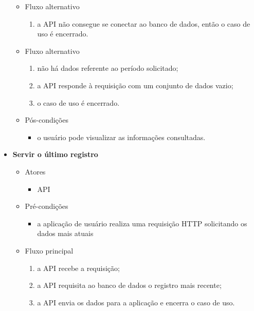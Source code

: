 \begin{itemize}
\begin{itemize}
			\item Fluxo alternativo
		    	\begin{enumerate}
			        \item a API não consegue se conectar ao banco de dados, então o caso de uso é encerrado.
		    	\end{enumerate}
    		
    		\item Fluxo alternativo
		    	\begin{enumerate}
			        \item não há dados referente ao período solicitado;
			        \item a API responde à requisição com um conjunto de dados vazio;
			        \item o caso de uso é encerrado.
		    	\end{enumerate}
		    	
		    \item Pós-condições
			    \begin{itemize}
        			\item o usuário pode visualizar as informações consultadas.
		    	\end{itemize}
		\end{itemize}
		
	\item \textbf{Servir o último registro}

		\begin{itemize}
    		\item Atores
			    \begin{itemize}
    	    		\item API
			    \end{itemize}

		    \item Pré-condições
			    \begin{itemize}
     		   		\item a aplicação de usuário realiza uma requisição HTTP solicitando os dados mais atuais
			    \end{itemize}

			\item Fluxo principal
   	 			\begin{enumerate}
		     	   \item a API recebe a requisição;
			        \item a API requisita ao banco de dados o registro mais recente;
		    	    \item a API envia os dados para a aplicação e encerra o caso de uso.
		   		 \end{enumerate}


\end{itemize}
\end{itemize}
